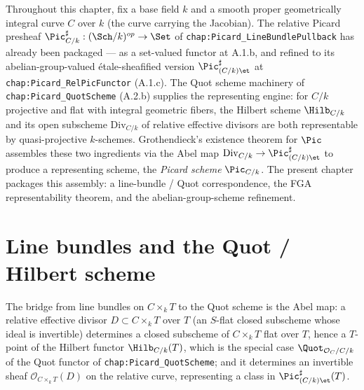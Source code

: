 Throughout this chapter, fix a base field \(k\) and a smooth proper geometrically
integral curve \(C\) over \(k\) (the curve carrying the Jacobian). The relative
Picard presheaf \(\Pic^\sharp_{C/k} : (\Sch/k)^{op} \to \Set\) of
\texttt{chap:Picard\_LineBundlePullback} has already been packaged --- as a
set-valued functor at A.1.b, and refined to its abelian-group-valued
\'etale-sheafified version \(\Pic^\sharp_{(C/k)\et}\) at
\texttt{chap:Picard\_RelPicFunctor} (A.1.c). The Quot scheme machinery of
\texttt{chap:Picard\_QuotScheme} (A.2.b) supplies the representing engine: for
\(C/k\) projective and flat with integral geometric fibers, the Hilbert scheme
\(\Hilb_{C/k}\) and its open subscheme \(\mathrm{Div}_{C/k}\) of relative effective
divisors are both representable by quasi-projective \(k\)-schemes. Grothendieck's
existence theorem for \(\Pic\) assembles these two ingredients via the Abel
map \(\mathrm{Div}_{C/k} \to \Pic^\sharp_{(C/k)\et}\) to produce a representing scheme,
the \emph{Picard scheme} \(\Pic_{C/k}\). The present chapter packages this
assembly: a line-bundle / Quot correspondence, the FGA representability
theorem, and the abelian-group-scheme refinement.


\section{Line bundles and the Quot / Hilbert scheme}
\label{sec:fga_pic_line_bundle_quot}

The bridge from line bundles on \(C \times_k T\) to the Quot scheme is the
Abel map: a relative effective divisor \(D \subset C \times_k T\) over \(T\)
(an \(S\)-flat closed subscheme whose ideal is invertible) determines a closed
subscheme of \(C \times_k T\) flat over \(T\), hence a \(T\)-point of the Hilbert
functor \(\Hilb_{C/k}(T)\), which is the special case \(\Quot_{\mathcal{O}_C/C/k}\)
of the Quot functor of \texttt{chap:Picard\_QuotScheme}; and it determines an
invertible sheaf \(\mathcal{O}_{C \times_k T}(D)\) on the relative curve,
representing a class in \(\Pic^\sharp_{(C/k)\et}(T)\).

